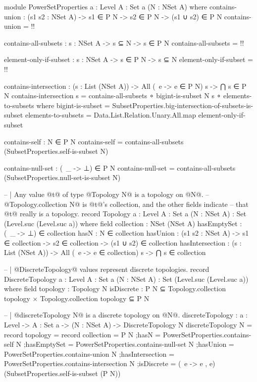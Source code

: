 \begin{code}
module PowerSetProperties {a : Level} {A : Set a} (N : NSet A) where
  contains-union : (s1 s2 : NSet A) -> s1 ∈ P N -> s2 ∈ P N -> (s1 ∪ s2) ∈ P N
  contains-union = {!!}

  contains-all-subsets : {s : NSet A} -> s ⊆ N -> s ∈ P N
  contains-all-subsets = {!!}

  element-only-if-subset : {s : NSet A} -> s ∈ P N -> s ⊆ N
  element-only-if-subset = {!!}

  contains-intersection : (s : List (NSet A)) ->
                          All (\ e -> e ∈ P N) s ->
                          ⋂ s ∈ P N
  contains-intersection s = contains-all-subsets ∘ bigint-is-subset N s ∘ elements-to-subsets
    where
    bigint-is-subset = SubsetProperties.big-intersection-of-subsets-is-subset
    elements-to-subsets = Data.List.Relation.Unary.All.map element-only-if-subset

  contains-self : N ∈ P N
  contains-self = contains-all-subsets (SubsetProperties.self-is-subset N)

  contains-null-set : (\ _ -> ⊥) ∈ P N
  contains-null-set = contains-all-subsets (SubsetProperties.null-set-is-subset N)

-- | Any value @t@ of type @Topology N@ is a topology on @N@.
-- @Topology.collection N@ is @t@'s collection, and the other fields indicate
-- that @t@ really is a topology.
record Topology {a : Level}
                {A : Set a}
                (N : NSet A) : Set (Level.suc (Level.suc a)) where
  field
    collection : NSet (NSet A)
    hasEmptySet : (\ _ -> ⊥) ∈ collection
    hasN : N ∈ collection
    hasUnion : (s1 s2 : NSet A) ->
               s1 ∈ collection ->
               s2 ∈ collection ->
               (s1 ∪ s2) ∈ collection
    hasIntersection : (s : List (NSet A)) ->
                      All (\ e -> e ∈ collection) s ->
                      ⋂ s ∈ collection

-- | @DiscreteTopology@ values represent discrete topologies.
record DiscreteTopology {a : Level}
                        {A : Set a}
                        (N : NSet A) : Set (Level.suc (Level.suc a)) where
  field
    topology : Topology N
    isDiscrete : P N ⊆ Topology.collection topology ×
                 Topology.collection topology ⊆ P N

-- | @discreteTopology N@ is a discrete topology on @N@.
discreteTopology : {a : Level} -> {A : Set a} -> (N : NSet A) -> DiscreteTopology N
discreteTopology N = record
  {topology = record
     {collection = P N
     ;hasN = PowerSetProperties.contains-self N
     ;hasEmptySet = PowerSetProperties.contains-null-set N
     ;hasUnion = PowerSetProperties.contains-union N
     ;hasIntersection = PowerSetProperties.contains-intersection N
     }
  ;isDiscrete = (\ e -> e , e) (SubsetProperties.self-is-subset (P N))}


\end{code}
